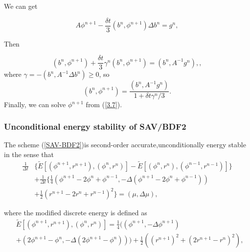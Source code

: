 \documentclass{beamer}
\begin{document}
    \begin{frame}

We can get

\begin{equation}\label{3.7}
  A\phi^{n+1}-\frac{\delta t}{3}(b^n, \phi^{n+1})\Delta b^n=g^n,
\end{equation}

Then

\begin{equation}\label{3.8}
  (b^n,\phi^{n+1})+\frac{\delta t}{3}\gamma^n(b^n,\phi^{n+1})=(b^n,A^{-1}g^n),,
\end{equation}
where $\gamma=-(b^n,A^{-1}\Delta b^n)\geq 0$, so
\begin{equation}\label{3.9}
  (b^n,\phi^{n+1})=\frac{(b^n,A^{-1}g^n)}{1+\delta t\gamma^n/3}.
\end{equation}
Finally, we can solve $\phi^{n+1}$ from (\ref{3.7}).

    \end{frame}
    \begin{frame}
\frametitle{Unconditional energy stability of SAV/BDF2}

The scheme (\ref{SAV-BDF2})is second-order accurate,unconditionally energy stable in the sense that
\begin{equation}\label{the2.2}
  \begin{split}
     \frac{1}{\Delta t} & \{ \tilde{E}[ (\phi^{n+1},r^{n+1}),(\phi^n,r^n) ]-\tilde{E}[ (\phi^{n},r^{n}),(\phi^{n-1},r^{n-1}) ] \}\\
       & +\frac{1}{\Delta t}\{ \frac{1}{4}(\phi^{n+1}-2\phi^n+\phi^{n-1},-\Delta(\phi^{n+1}-2\phi^n+\phi^{n-1}))\\
       & +\frac{1}{2}(r^{n+1}-2r^n+r^{n-1})^2 \}=(\mu,\Delta \mu), 
  \end{split}
\end{equation}

where the modified discrete energy is defined as
\begin{equation}\label{the2.2.2}
  \begin{split}
     &\tilde{E}[(\phi^{n+1},r^{n+1}),(\phi^n,r^n)]=\frac{1}{4}((\phi^{n+1},-\Delta\phi^{n+1})\\
     &+(2\phi^{n+1}-\phi^n,-\Delta(2\phi^{n+1}-\phi^n)))+\frac{1}{2}\left((r^{n+1})^2+(2r^{n+1}-r^n)^2\right),
  \end{split}
\end{equation}
    \end{frame}
\end{document}
